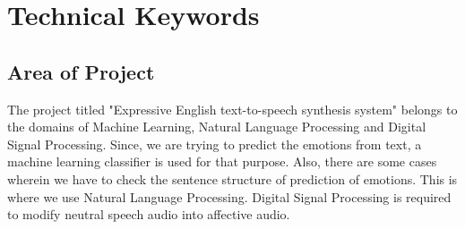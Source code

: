 \documentclass[oneside,a4paper,12pt]{book}
\begin{document}
\chapter{Technical Keywords}
\section{Area of Project}
The project titled "Expressive English text-to-speech synthesis system" belongs to the domains of Machine Learning, Natural Language Processing and Digital Signal Processing. Since, we are trying to predict the emotions from text, a machine learning classifier is used for that purpose. Also, there are some cases wherein we have to check the sentence structure of prediction of emotions. This is where we use Natural Language Processing. Digital Signal Processing is required to modify neutral speech audio into affective audio.
\end{document}
